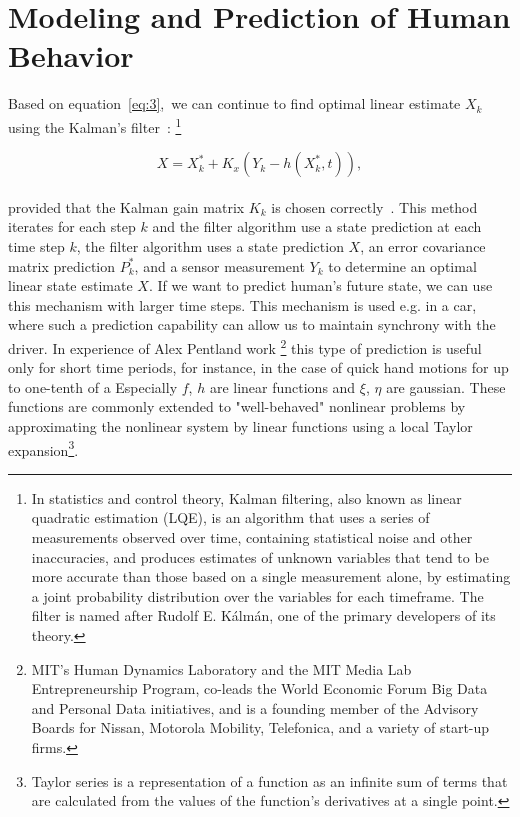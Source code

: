 \section{Modeling and Prediction of Human Behavior} \label{sec:prediction}
Based on equation~\ref{eq:3},\ we can continue to find optimal linear estimate $X_k$ using the Kalman's filter~\cite{pantland}: \footnote{In statistics
and control theory, Kalman filtering, also known as linear quadratic estimation (LQE), is an algorithm that
uses a series of measurements observed over time, containing statistical noise and other inaccuracies, and produces
estimates of unknown variables that tend to be more accurate than those based on a single measurement alone, by estimating
a joint probability distribution over the variables for each timeframe.
The filter is named after Rudolf E. Kálmán, one of the primary developers of its theory.}

\begin{equation} \label{eq:5}
X = X_{k}^{*} + K_x(Y_k - h(X_{k}^{*},t)),
\end{equation}
\\
provided that the Kalman gain matrix $K_k$ is chosen correctly~\cite{kalman}.
This method iterates for each step $k$ and the filter algorithm use a state prediction at each time step $k$, the filter algorithm
uses a state prediction $X$, an error covariance matrix prediction $P_k^*$, and a sensor measurement $Y_k$ to determine an optimal linear state estimate $X$.
If we want to predict human’s future state, we can use this mechanism with larger time steps.
This mechanism is used e.g. in a car, where such a prediction capability can allow us to maintain synchrony with the driver.
In experience of Alex Pentland work \footnote{MIT's Human Dynamics Laboratory and the MIT Media Lab Entrepreneurship
Program, co-leads the World Economic Forum Big Data and Personal Data initiatives, and is a founding member
of the Advisory Boards for Nissan, Motorola Mobility, Telefonica, and a variety of start-up firms.} this type of prediction is useful only for short time periods,
for instance, in the case of quick hand motions for up to one-tenth of a
Especially $f$, $h$ are linear functions and $\xi$, $\eta$ are gaussian.
These functions are commonly extended to "well-behaved" nonlinear problems by approximating
the nonlinear system by linear functions using a local Taylor expansion\footnote{Taylor series is a representation of a function
as an infinite sum of terms that are calculated from the values of the function's derivatives at a single point.}.

